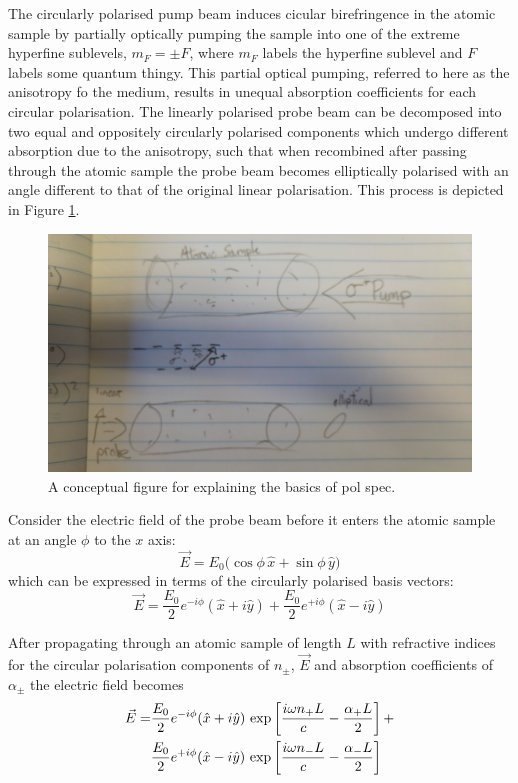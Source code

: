 The circularly polarised pump beam induces cicular birefringence in the atomic sample by partially optically pumping the sample into one of the extreme hyperfine sublevels, $m_F=\pm F$, where $m_F$ labels the hyperfine sublevel and $F$ labels {\color{red}some quantum thingy.}
This partial optical pumping, referred to here as the anisotropy fo the medium, results in unequal absorption coefficients for each circular polarisation.
The linearly polarised probe beam can be decomposed into two equal and oppositely circularly polarised components which undergo different absorption due to the anisotropy, such that when recombined after passing through the atomic sample the probe beam becomes elliptically polarised with an angle different to that of the original linear polarisation.
This process is depicted in Figure \ref{figure:pol_spec_explanation}.

\begin{figure}
\centering
\includegraphics[width=\linewidth,angle=180]{chapter1/Figs/pol_spec_explanation_placeholder.jpg}
\caption{A conceptual figure for explaining the basics of pol spec.}
\label{figure:pol_spec_explanation}
\end{figure}

Consider the electric field of the probe beam before it enters the atomic sample at an angle $\phi$ to the $x$ axis:
\begin{equation}
\vec{E}=E_0\big(\cos{\phi}\,\hat{x}+\sin{\phi}\,\hat{y}\big)
\end{equation}
which can be expressed in terms of the circularly polarised basis vectors:
\begin{equation}
\vec{E} = \frac{E_0}{2}e^{-i\phi}(\hat{x}+i\hat{y}) + \frac{E_0}{2}e^{+i\phi}(\hat{x}-i\hat{y})
\end{equation}

After propagating through an atomic sample of length $L$ with refractive indices for the circular polarisation components of $n_\pm$, $\vec{E}$ and absorption coefficients of $\alpha_\pm$ the electric field becomes
\begin{align}
\vec{E} = &\frac{E_0}{2}e^{-i\phi}(\hat{x}+i\hat{y})\,\exp\left[\frac{i\omega n_+ L}{c} - \frac{\alpha_+ L}{2}\right] +\notag\\
&\frac{E_0}{2}e^{+i\phi}(\hat{x}-i\hat{y})\,\exp\left[\frac{i\omega n_- L}{c} - \frac{\alpha_- L}{2}\right]\label{equation:elliptically_polarised}
\end{align}

